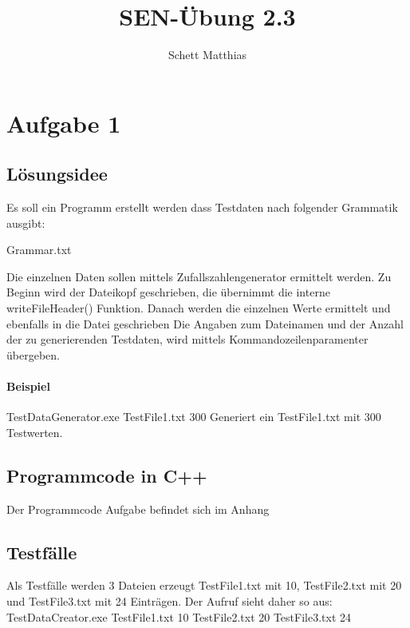 \documentclass[10pt,a4paper, parskip=half]{scrartcl}
\author{Schett Matthias}
\title{SEN-Übung 2.3}
\begin{document}
\maketitle

\section{Aufgabe 1}
\label{sec:Aufgabe1}

\subsection{L\"{o}sungsidee}
Es soll ein Programm erstellt werden dass Testdaten nach folgender Grammatik ausgibt:


{Grammar.txt}

Die einzelnen Daten sollen mittels Zufallszahlengenerator ermittelt werden.
Zu Beginn wird der Dateikopf geschrieben, die übernimmt die interne writeFileHeader() Funktion.
Danach werden die einzelnen Werte ermittelt und ebenfalls in die Datei geschrieben
Die Angaben zum Dateinamen und der Anzahl der zu generierenden Testdaten, wird mittels Kommandozeilenparamenter übergeben.

\paragraph{Beispiel} %
\label{par:Beispiel}
TestDataGenerator.exe TestFile1.txt 300
\newline
Generiert ein TestFile1.txt mit 300 Testwerten.

\subsection{Programmcode in C++}

Der Programmcode Aufgabe befindet sich im Anhang

\subsection{Testf\"{a}lle}
Als Testfälle werden 3 Dateien erzeugt TestFile1.txt mit 10, TestFile2.txt mit 20 und TestFile3.txt mit 24 Einträgen.
Der Aufruf sieht daher so aus:
\newline
\indent TestDataCreator.exe TestFile1.txt 10 TestFile2.txt 20 TestFile3.txt 24
\end{document}
